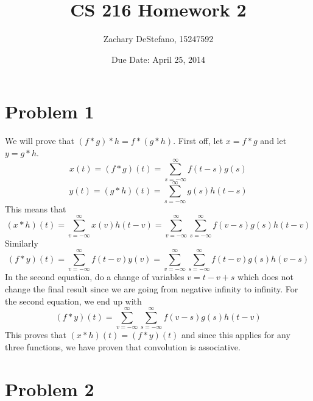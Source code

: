 \documentclass[11pt,psfig]{article}
\begin{document}
\setlength{\parskip}{1.2ex plus0.3ex minus 0.3ex}


\thispagestyle{empty} \pagestyle{myheadings} 



\title{CS 216 Homework 2}
\author{Zachary DeStefano, 15247592}
\date{Due Date: April 25, 2014}

\maketitle

\vfill\eject

\newpage

\section*{Problem 1}

We will prove that $(f*g)*h=f*(g*h)$. First off, let $x=f*g$ and let $y=g*h$. \\
\[
x(t) = (f*g)(t) = \sum_{s=-\infty}^{\infty} f(t-s)g(s)
\]
\[
y(t) = (g*h)(t) = \sum_{s=-\infty}^{\infty} g(s)h(t-s)
\]
This means that
\[
(x*h)(t) = \sum_{v=-\infty}^{\infty} x(v)h(t-v) = \sum_{v=-\infty}^{\infty} \sum_{s=-\infty}^{\infty} f(v-s)g(s)h(t-v)
\]
Similarly
\[
(f*y)(t) = \sum_{v=-\infty}^{\infty} f(t-v)y(v) = \sum_{v=-\infty}^{\infty} \sum_{s=-\infty}^{\infty} f(t-v)g(s)h(v-s)
\]
In the second equation, do a change of variables $v = t-v+s$ which does not change the final result since we are going from negative infinity to infinity. For the second equation, we end up with \\
\[
(f*y)(t) = \sum_{v=-\infty}^{\infty} \sum_{s=-\infty}^{\infty} f(v-s)g(s)h(t-v)
\]
This proves that $(x*h)(t)=(f*y)(t)$ and since this applies for any three functions, we have proven that convolution is associative. 

\section*{Problem 2}
\end{document}
